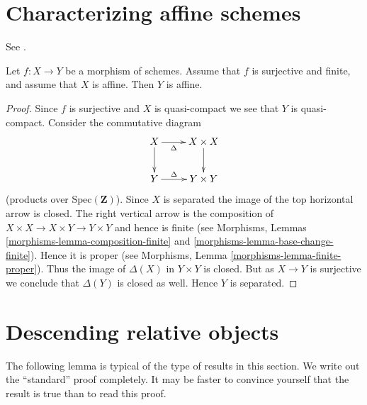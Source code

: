 \section{Characterizing affine schemes}
\label{section-affine}

\noindent
See \cite{Conrad-Nagata}.

\begin{lemma}
\label{lemma-affine}
Let $f : X \to Y$ be a morphism of schemes.
Assume that $f$ is surjective and finite, and assume that $X$ is affine.
Then $Y$ is affine.
\end{lemma}

\begin{proof}
Since $f$ is surjective and $X$ is quasi-compact we see that $Y$ is
quasi-compact. Consider the commutative diagram
$$
\xymatrix{
X \ar[d] \ar[r]_-{\Delta} & X \times X \ar[d] \\
Y  \ar[r]^-{\Delta} & Y \times Y
}
$$
(products over $\text{Spec}(\mathbf{Z})$).
Since $X$ is separated the image of the top horizontal arrow
is closed. The right vertical arrow is the composition of
$X\times X \to X \times Y \to Y \times Y$ and hence is finite
(see Morphisms, Lemmas \ref{morphisms-lemma-composition-finite} and
\ref{morphisms-lemma-base-change-finite}). Hence it is proper (see
Morphisms, Lemma \ref{morphisms-lemma-finite-proper}). Thus the image
of $\Delta(X)$ in $Y \times Y$ is closed. But as $X \to Y$ is surjective
we conclude that $\Delta(Y)$ is closed as well. Hence $Y$ is separated.

\medskip\noindent



\end{proof}













\section{Descending relative objects}
\label{section-descending-relative}

\noindent
The following lemma is typical of the type of results in this section.
We write out the ``standard'' proof completely. It may be faster to
convince yourself that the result is true than to read this proof.


